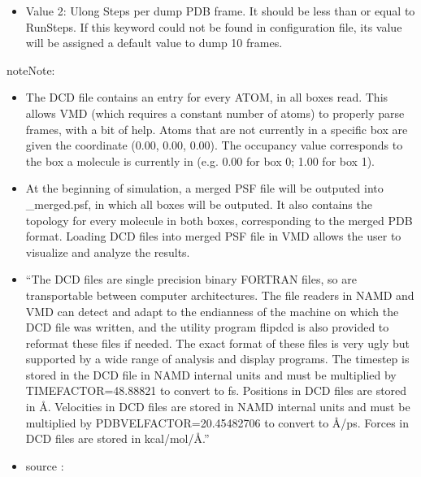 \documentclass[letterpaper,10pt,english]{sphinxmanual}
\begin{document}
\begin{description}
\begin{itemize}
\item {} 
\sphinxAtStartPar
Value 2: Ulong \sphinxhyphen{} Steps per dump PDB frame. It should be less than or equal to RunSteps. If this
keyword could not be found in configuration file, its value will be assigned a default value to dump 10 frames.

\end{itemize}

\begin{sphinxadmonition}{note}{Note:}\begin{itemize}
\item {} 
\sphinxAtStartPar
The DCD file contains an entry for every ATOM, in all boxes read. This allows VMD (which requires a
constant number of atoms) to properly parse frames, with a bit of help. Atoms that are not currently
in a specific box are given the coordinate (0.00, 0.00, 0.00). The occupancy value corresponds to the
box a molecule is currently in (e.g. 0.00 for box 0; 1.00 for box 1).

\item {} 
\sphinxAtStartPar
At the beginning of simulation, a merged PSF file will be outputed into \_merged.psf,
in which all boxes will be outputed. It also contains the topology for every molecule in both boxes,
corresponding to the merged PDB format. Loading DCD files into merged PSF file in VMD allows the user
to visualize and analyze the results.

\item {} 
\sphinxAtStartPar
“The DCD files are single precision binary FORTRAN files, so are transportable between computer architectures. The file readers in NAMD and VMD can detect and adapt to the endianness of the machine on which the DCD file was written, and the utility program flipdcd is also provided to reformat these files if needed. The exact format of these files is very ugly but supported by a wide range of analysis and display programs. The timestep is stored in the DCD file in NAMD internal units and must be multiplied by TIMEFACTOR=48.88821 to convert to fs. Positions in DCD files are stored in Å. Velocities in DCD files are stored in NAMD internal units and must be multiplied by PDBVELFACTOR=20.45482706 to convert to Å/ps. Forces in DCD files are stored in kcal/mol/Å.”

\item {} 
\sphinxAtStartPar
source : 

\end{itemize}
\end{sphinxadmonition}


\end{description}
\end{document}
